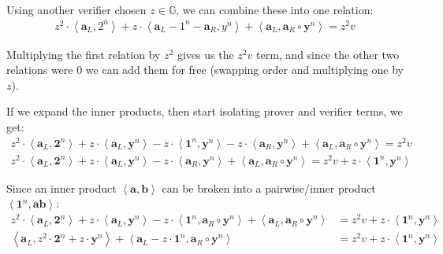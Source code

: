 \documentclass{article}
\begin{document}
Using another verifier chosen $z \in \mathbb{G}$, we can combine these into one relation:
\begin{align}
  z^2 \cdot \left<\textbf{a}_L, 2^n\right> + z \cdot \left<\textbf{a}_L - 1^n - \textbf{a}_R, y^n\right> + \left<\textbf{a}_L, \textbf{a}_R \circ \textbf{y}^n\right> = z^2 v
\end{align}

Multiplying the first relation by $z^2$ gives us the $z^2 v$ term, and since the other two relations were $0$ we can add them for free (swapping order and multiplying one by $z$).

If we expand the inner products, then start isolating prover and verifier terms, we get:
\begin{align}
  z^2 \cdot \left<\textbf{a}_L, \textbf{2}^n\right> + z \cdot \left<\textbf{a}_L, \textbf{y}^n\right> - z \cdot \left<\textbf{1}^n, \textbf{y}^n\right> - z \cdot \left<\textbf{a}_R, \textbf{y}^n\right> + \left<\textbf{a}_L, \textbf{a}_R \circ \textbf{y}^n\right> = z^2 v\nonumber\\
  z^2 \cdot \left<\textbf{a}_L, \textbf{2}^n\right> + z \cdot \left<\textbf{a}_L, \textbf{y}^n\right> - z \cdot \left<\textbf{a}_R, \textbf{y}^n\right> + \left<\textbf{a}_L, \textbf{a}_R \circ \textbf{y}^n\right> = z^2 v + z \cdot \left<\textbf{1}^n, \textbf{y}^n\right>\nonumber
\end{align}

Since an inner product $\left<\textbf{a}, \textbf{b}\right>$ can be broken into a pairwise/inner product $\left<\textbf{1}^n, \textbf{a} \textbf{b}\right>$:
\begin{align}
  z^2 \cdot \left<\textbf{a}_L, \textbf{2}^n\right> + z \cdot \left<\textbf{a}_L, \textbf{y}^n\right> - z \cdot \left<\textbf{1}^n, \textbf{a}_R \circ \textbf{y}^n\right> + \left<\textbf{a}_L, \textbf{a}_R \circ \textbf{y}^n\right> &= z^2 v + z \cdot \left<\textbf{1}^n, \textbf{y}^n\right>\nonumber\\
  \left<\textbf{a}_L, z^2 \cdot \textbf{2}^n + z \cdot \textbf{y}^n\right> + \left<\textbf{a}_L - z \cdot \textbf{1}^n, \textbf{a}_R \circ \textbf{y}^n\right> &= z^2 v + z \cdot \left<\textbf{1}^n, \textbf{y}^n\right>\nonumber
\end{align}
\end{document}
